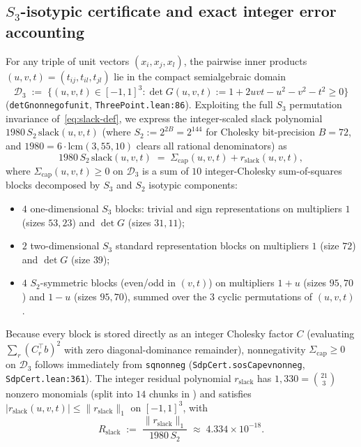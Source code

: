 \documentclass[11pt,reqno]{amsart}
\renewcommand{\_}{\origunderscore\allowbreak}
\theoremstyle{definition}
\newcommand{\norm}[1]{\lVert #1 \rVert}
\begin{document}
\subsection{\texorpdfstring{$S_3$}{S3}-isotypic certificate and exact integer error accounting}\label{subsec:sdp-cert}
For any triple of unit vectors $(x_i, x_j, x_l)$, the pairwise inner products $(u,v,t) = (t_{ij}, t_{il}, t_{jl})$ lie in the compact semialgebraic domain
\[
  \mathcal{D}_3 \;:=\; \{(u,v,t) \in [-1,1]^3 : \det G(u,v,t) := 1 + 2uvt - u^2 - v^2 - t^2 \ge 0\}
\]
(\texttt{detG\_nonneg\_of\_unit}, \texttt{ThreePoint.lean:86}).
Exploiting the full $S_3$ permutation invariance of~\eqref{eq:slack-def}, we express the integer-scaled slack polynomial $1980\,S_2\,\mathrm{slack}(u,v,t)$ (where $S_2 := 2^{2B} = 2^{144}$ for Cholesky bit-precision $B = 72$, and $1980 = 6 \cdot \mathrm{lcm}(3, 55, 10)$ clears all rational denominators) as
\begin{equation}\label{eq:slack-sos}
  1980\,S_2\,\mathrm{slack}(u,v,t) \;=\; \Sigma_{\mathrm{cap}}(u,v,t) + r_{\mathrm{slack}}(u,v,t),
\end{equation}
where $\Sigma_{\mathrm{cap}}(u,v,t) \ge 0$ on $\mathcal{D}_3$ is a sum of $10$ integer-Cholesky sum-of-squares blocks decomposed by $S_3$ and $S_2$ isotypic components:
\begin{itemize}[leftmargin=2em,itemsep=1pt,topsep=3pt]
  \item $4$ one-dimensional $S_3$ blocks: trivial and sign representations on multipliers $1$ (sizes $53, 23$) and $\det G$ (sizes $31, 11$);
  \item $2$ two-dimensional $S_3$ standard representation blocks on multipliers $1$ (size $72$) and $\det G$ (size $39$);
  \item $4$ $S_2$-symmetric blocks (even/odd in $(v,t)$) on multipliers $1+u$ (sizes $95, 70$) and $1-u$ (sizes $95, 70$), summed over the $3$ cyclic permutations of $(u,v,t)$.
\end{itemize}
Because every block is stored directly as an integer Cholesky factor $C$ (evaluating $\sum_r (C_r^\top b)^2$ with zero diagonal-dominance remainder), nonnegativity $\Sigma_{\mathrm{cap}} \ge 0$ on $\mathcal{D}_3$ follows immediately from \texttt{sq\_nonneg} (\texttt{SdpCert.sosCap\_ev\_nonneg}, \texttt{SdpCert.lean:361}).
The integer residual polynomial $r_{\mathrm{slack}}$ has $1{,}330 = \binom{21}{3}$ nonzero monomials (split into $14$ chunks in ) and satisfies $|r_{\mathrm{slack}}(u,v,t)| \le \norm{r_{\mathrm{slack}}}_1$ on $[-1,1]^3$, with
\[
  R_{\mathrm{slack}} \;:=\; \frac{\norm{r_{\mathrm{slack}}}_1}{1980\,S_2} \;\approx\; 4.334 \times 10^{-18}.
\]
\end{document}
